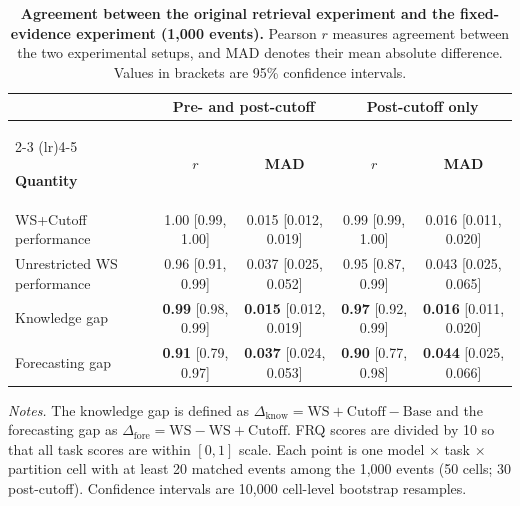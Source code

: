\begin{table}[t]
\centering
\caption{
\textbf{Agreement between the original retrieval experiment and the
fixed-evidence experiment (1,000 events).}
Pearson $r$ measures agreement between the two experimental setups, and MAD
denotes their mean absolute difference. Values in brackets are 95\% confidence
intervals.
}
\label{tab:fixed_packet_agreement}

\small
\setlength{\tabcolsep}{4pt}
\renewcommand{\arraystretch}{1.12}

\begin{tabular}{lcccc}
\toprule
&
\multicolumn{2}{c}{\textbf{Pre- and post-cutoff}}
&
\multicolumn{2}{c}{\textbf{Post-cutoff only}}
\\
\cmidrule(lr){2-3}
\cmidrule(lr){4-5}

\textbf{Quantity}
& \boldmath$r$
& \textbf{MAD}
& \boldmath$r$
& \textbf{MAD}
\\
\midrule

WS+Cutoff performance
& 1.00 {\tiny[0.99, 1.00]}
& 0.015 {\tiny[0.012, 0.019]}
& 0.99 {\tiny[0.99, 1.00]}
& 0.016 {\tiny[0.011, 0.020]}
\\

Unrestricted WS performance
& 0.96 {\tiny[0.91, 0.99]}
& 0.037 {\tiny[0.025, 0.052]}
& 0.95 {\tiny[0.87, 0.99]}
& 0.043 {\tiny[0.025, 0.065]}
\\

Knowledge gap
& \textbf{0.99} {\tiny[0.98, 0.99]}
& \textbf{0.015} {\tiny[0.012, 0.019]}
& \textbf{0.97} {\tiny[0.92, 0.99]}
& \textbf{0.016} {\tiny[0.011, 0.020]}
\\

Forecasting gap
& \textbf{0.91} {\tiny[0.79, 0.97]}
& \textbf{0.037} {\tiny[0.024, 0.053]}
& \textbf{0.90} {\tiny[0.77, 0.98]}
& \textbf{0.044} {\tiny[0.025, 0.066]}
\\

\bottomrule
\end{tabular}

\vspace{3pt}
\begin{minipage}{0.96\textwidth}
\footnotesize
\textit{Notes.}
The knowledge gap is defined as $\Delta_{\mathrm{know}}=\mathrm{WS+Cutoff}-\mathrm{Base}$ and the forecasting gap as $\Delta_{\mathrm{fore}}=\mathrm{WS}-\mathrm{WS+Cutoff}$.
FRQ scores are divided by 10 so that all task scores are within $[0,1]$ scale.
Each point is one model $\times$ task $\times$ partition cell with at least 20 matched events among the 1,000 events (50 cells; 30 post-cutoff). Confidence intervals are 10,000 cell-level bootstrap resamples.
\end{minipage}

\end{table}
